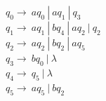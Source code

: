 \documentclass[10pt]{article}
\begin{document}
{\begin{enumerate}
		\\\\
		$q_0\rightarrow\ aq_0\ |\ aq_1\ |\ q_3$\\
		$q_1\rightarrow\ aq_1\ |\ bq_4\ |\ aq_2\ |\ q_2$\\
		$q_2\rightarrow\ aq_2\ |\ bq_2\ |\ aq_5$\\
		$q_3\rightarrow\ bq_0\ |\ \lambda$\\
		$q_4\rightarrow\ q_5\ |\ \lambda$\\
		$q_5\rightarrow\ aq_5\ |\ bq_2$
		
	\end{enumerate}	
}
\end{document}
